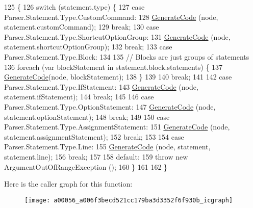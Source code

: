 \begin{DoxyCode}
125                                                                  \{
126             \textcolor{keywordflow}{switch} (statement.type) \{
127             \textcolor{keywordflow}{case} Parser.Statement.Type.CustomCommand:
128                 \hyperlink{a00056_a006f3becd521cc179ba3d3352f6f930b}{GenerateCode} (node, statement.customCommand);
129                 \textcolor{keywordflow}{break};
130             \textcolor{keywordflow}{case} Parser.Statement.Type.ShortcutOptionGroup:
131                 \hyperlink{a00056_a006f3becd521cc179ba3d3352f6f930b}{GenerateCode} (node, statement.shortcutOptionGroup);
132                 \textcolor{keywordflow}{break};
133             \textcolor{keywordflow}{case} Parser.Statement.Type.Block:
134 
135                 \textcolor{comment}{// Blocks are just groups of statements}
136                 \textcolor{keywordflow}{foreach} (var blockStatement \textcolor{keywordflow}{in} statement.block.statements) \{
137                     \hyperlink{a00056_a006f3becd521cc179ba3d3352f6f930b}{GenerateCode}(node, blockStatement);
138                 \}
139 
140                 \textcolor{keywordflow}{break};
141 
142             \textcolor{keywordflow}{case} Parser.Statement.Type.IfStatement:
143                 \hyperlink{a00056_a006f3becd521cc179ba3d3352f6f930b}{GenerateCode} (node, statement.ifStatement);
144                 \textcolor{keywordflow}{break};
145 
146             \textcolor{keywordflow}{case} Parser.Statement.Type.OptionStatement:
147                 \hyperlink{a00056_a006f3becd521cc179ba3d3352f6f930b}{GenerateCode} (node, statement.optionStatement);
148                 \textcolor{keywordflow}{break};
149 
150             \textcolor{keywordflow}{case} Parser.Statement.Type.AssignmentStatement:
151                 \hyperlink{a00056_a006f3becd521cc179ba3d3352f6f930b}{GenerateCode} (node, statement.assignmentStatement);
152                 \textcolor{keywordflow}{break};
153 
154             \textcolor{keywordflow}{case} Parser.Statement.Type.Line:
155                 \hyperlink{a00056_a006f3becd521cc179ba3d3352f6f930b}{GenerateCode} (node, statement, statement.line);
156                 \textcolor{keywordflow}{break};
157 
158             \textcolor{keywordflow}{default}:
159                 \textcolor{keywordflow}{throw} \textcolor{keyword}{new} ArgumentOutOfRangeException ();
160             \}
161 
162         \}
\end{DoxyCode}


Here is the caller graph for this function\-:
\nopagebreak
\begin{figure}[H]
\begin{center}
\leavevmode
\texttt{[image: a00056\_a006f3becd521cc179ba3d3352f6f930b\_icgraph]}
\end{center}
\end{figure}


